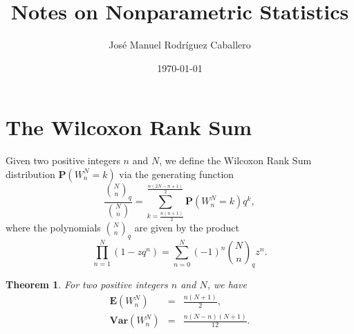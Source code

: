 \documentclass[12pt]{article} %
\title{Notes on Nonparametric Statistics}
\author{José Manuel Rodríguez Caballero}
\date{\today}
\newtheorem{theorem}{Theorem}
\theoremstyle{remark}
\begin{document}
\maketitle %

\section{The Wilcoxon Rank Sum}
Given two positive integers $n$ and $N$, we define the Wilcoxon Rank Sum distribution $\mathbf{P}\left( W^N_n = k\right)$ via the generating function
\begin{equation}
\frac{\binom{N}{n}_q}{\binom{N}{n}} = \sum_{k=\frac{n(n+1)}{2}}^{\frac{n(2N-n+1)}{2}}  \mathbf{P}\left( W^N_n = k\right) q^k, \label{eq:binom_P}
\end{equation}
where the polynomials $\binom{N}{n}_q$ are given by the product
\begin{equation}
\prod_{n=1}^N \left( 1 - z q^n\right) = \sum_{n=0}^N (-1)^n  \binom{N}{n}_q z^n. \label{eq:def_qbinom}
\end{equation}

\begin{theorem}
For two positive integers $n$ and $N$, we have
\begin{eqnarray}
\label{eq:expectation_W} \mathbf{E}\left( W^N_n \right) &=& \frac{n(N+1)}{2}, \\
\label{eq:variance_W} \mathbf{Var}\left( W^N_n \right) &=& \frac{n(N-n)(N+1)}{12}.
\end{eqnarray}
\end{theorem}
\end{document}
